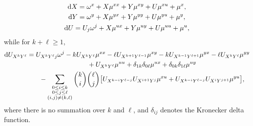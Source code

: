 \documentclass[10pt,a4paper]{amsart}
\numberwithin{equation}{section}
\begin{document}
%
\begin{gather*}
{\rm d}X = \omega^x + X \mu^{xx} + Y\mu^{xy} + U \mu^{xu} + \mu^x,
\\
{\rm d}Y = \omega^y + X \mu^{yx} + Y\mu^{yy} + U\mu^{yu} + \mu^y,
\\
{\rm d}U = U_j \omega^j + X\mu^{ux} + Y \mu^{uy} + U\mu^{uu} + \mu^u,
\end{gather*}
%
while for $k+\ell\geq 1$,
%
\begin{gather*}
{\rm d}U_{X^kY^\ell} = U_{X^kY^\ell j} \omega^j - k U_{X^k Y^\ell} \mu^{xx} - \ell U_{X^{k+1}Y^{\ell-1}} \mu^{xy} - k U_{X^{k-1}Y^{\ell+1}} \mu^{yx} - \ell U_{X^k Y^\ell} \mu^{yy}
\\ \hphantom{{\rm d}U_{X^kY^\ell} =}
{} + U_{X^k Y^\ell} \mu^{uu} + \delta_{1k}\delta_{0\ell} \mu^{ux} + \delta_{0k}\delta_{1\ell} \mu^{uy}
\\ \hphantom{{\rm d}U_{X^kY^\ell} =}
{} - \sum_{\substack{0\leq i \leq k\\0\leq j\leq \ell\\ (i,j)\neq (k,\ell)}} \binom{k}{i}\binom{\ell}{j} \big[ U_{X^{k-i}Y^{\ell-j}} U_{X^{i+1}Y^j} \mu^{xu} + U_{X^{k-i}Y^{\ell-j}} U_{X^i Y^{j+1}} \mu^{yu}\big],
\end{gather*}
where there is no summation over $k$ and $\ell$, and $\delta_{ij}$ denotes the Kronecker delta function.
\end{document}
